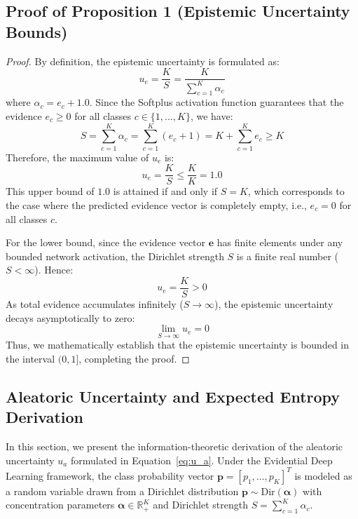 \documentclass[letterpaper]{article} %
\begin{document}
\subsection{Proof of Proposition 1 (Epistemic Uncertainty Bounds)}
\begin{proof}
By definition, the epistemic uncertainty is formulated as:
\begin{equation}
    u_e = \frac{K}{S} = \frac{K}{\sum_{c=1}^K \alpha_c}
\end{equation}
where $\alpha_c = e_c + 1.0$. Since the Softplus activation function guarantees that the evidence $e_c \ge 0$ for all classes $c \in \{1, \ldots, K\}$, we have:
\begin{equation}
    S = \sum_{c=1}^K \alpha_c = \sum_{c=1}^K (e_c + 1) = K + \sum_{c=1}^K e_c \ge K
\end{equation}
Therefore, the maximum value of $u_e$ is:
\begin{equation}
    u_e = \frac{K}{S} \le \frac{K}{K} = 1.0
\end{equation}
This upper bound of $1.0$ is attained if and only if $S = K$, which corresponds to the case where the predicted evidence vector is completely empty, i.e., $e_c = 0$ for all classes $c$. 

For the lower bound, since the evidence vector $\bm{e}$ has finite elements under any bounded network activation, the Dirichlet strength $S$ is a finite real number ($S < \infty$). Hence:
\begin{equation}
    u_e = \frac{K}{S} > 0
\end{equation}
As total evidence accumulates infinitely ($S \to \infty$), the epistemic uncertainty decays asymptotically to zero:
\begin{equation}
    \lim_{S \to \infty} u_e = 0
\end{equation}
Thus, we mathematically establish that the epistemic uncertainty is bounded in the interval $(0, 1]$, completing the proof.
\end{proof}

\subsection{Aleatoric Uncertainty and Expected Entropy Derivation}
In this section, we present the information-theoretic derivation of the aleatoric uncertainty $u_a$ formulated in Equation~\ref{eq:u_a}. Under the Evidential Deep Learning framework, the class probability vector $\bm{p} = [p_1, \ldots, p_K]^T$ is modeled as a random variable drawn from a Dirichlet distribution $\bm{p} \sim \text{Dir}(\bm{\alpha})$ with concentration parameters $\bm{\alpha} \in \mathbb{R}_+^K$ and Dirichlet strength $S = \sum_{c=1}^K \alpha_c$.
\end{document}
